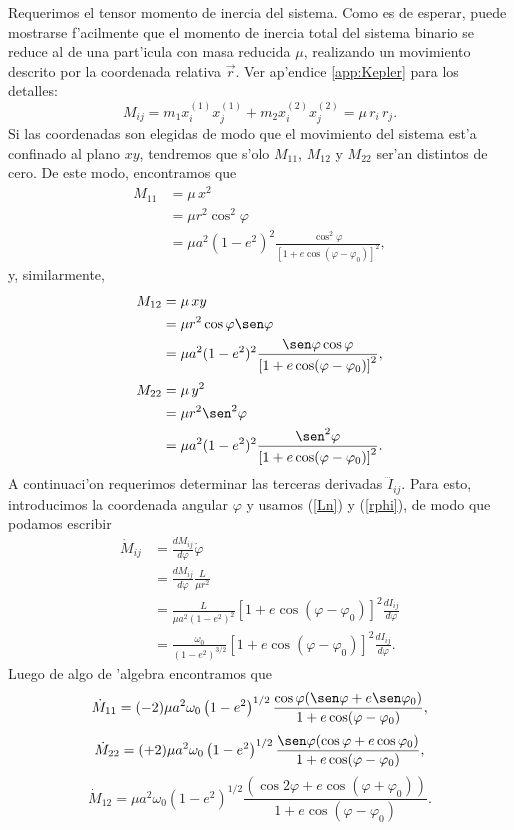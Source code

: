 Requerimos el tensor momento de inercia del sistema. Como es de esperar, puede mostrarse f'acilmente que el momento de inercia total del sistema binario se reduce al de una part'icula con masa reducida $\mu$, realizando un movimiento descrito por la coordenada relativa $\vec{r}$. Ver ap'endice \ref{app:Kepler} para los detalles:
\begin{equation}
M_{ij}=m_1x_i^{(1)}x_j^{(1)}+m_2x_i^{(2)}x_j^{(2)}=\mu\, r_i\,r_j.
\end{equation}
Si las coordenadas son elegidas de modo que el movimiento del sistema est'a confinado al plano $xy$, tendremos que s'olo $M_{11}$, $M_{12}$ y $M_{22}$ ser'an distintos de cero. De este modo, encontramos que
\begin{align}
M_{11} & = \mu\, x^2\\
& = \mu r^2\cos^2\varphi \\
& = \mu a^2(1-e^2)^2\frac{\cos^2\varphi}{\left[1+e\cos(\varphi-\varphi_0)\right]^2},
\end{align}
y, similarmente,
\begin{align}
M_{12} & = \mu\, xy \\
& = \mu r^2\cos\varphi\sen\varphi \\
& = \mu a^2(1-e^2)^2\frac{\sen\varphi\cos\varphi}{\left[1+e\cos(\varphi-\varphi_0)\right]^2},
\end{align}
\begin{align}
M_{22} & = \mu\, y^2 \\
& = \mu r^2\sen^2\varphi \\
& = \mu a^2(1-e^2)^2\frac{\sen^2\varphi}{\left[1+e\cos(\varphi-\varphi_0)\right]^2}.
\end{align}
A continuaci'on requerimos determinar las terceras derivadas $\dddot{I}_{ij}$. Para esto, introducimos la coordenada angular $\varphi$ y usamos (\ref{Ln}) y (\ref{rphi}), de modo que podamos escribir
\begin{align}
\dot{M}_{ij} &= \frac{dM_{ij}}{d\varphi}\dot{\varphi} \\
&= \frac{dM_{ij}}{d\varphi}\frac{L}{\mu r^2} \\
&= \frac{L}{\mu a^2(1-e^2)^2}\left[1+e\cos(\varphi-\varphi_0)\right]^2 \frac{dI_{ij}}{d\varphi}\\
&= \frac{\omega_0}{(1-e^2)^{3/2}}\left[1+e\cos(\varphi-\varphi_0)\right]^2 \frac{dI_{ij}}{d\varphi}.
\end{align}
Luego de algo de 'algebra encontramos que
\begin{equation}
\dot{M}_{11}=(-2)\mu a^2\omega_0\left(1-e^2\right)^{1/2}\frac{\cos\varphi(\sen\varphi+e\sen\varphi_0)}{1+e\cos(\varphi-\varphi_0)},
\end{equation}
\begin{equation}
\dot{M}_{22}=(+2)\mu a^2\omega_0\left(1-e^2\right)^{1/2}\frac{\sen\varphi(\cos\varphi+e\cos\varphi_0)}{1+e\cos(\varphi-\varphi_0)},
\end{equation}
\begin{equation}
\dot{M}_{12}=\mu a^2\omega_0\left(1-e^2\right)^{1/2}\frac{(\cos2\varphi+e\cos(\varphi+\varphi_0))}{1+e\cos(\varphi-\varphi_0)}.
\end{equation}

